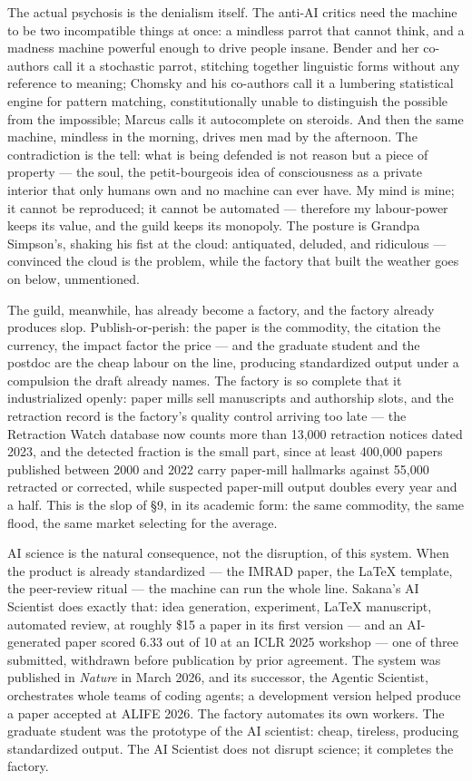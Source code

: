 \documentclass[11pt]{article}
\begin{document}
The actual psychosis is the denialism itself. The anti-AI critics need
the machine to be two incompatible things at once: a mindless parrot
that cannot think, and a madness machine powerful enough to drive
people insane. Bender and her co-authors call it a stochastic parrot,
stitching together linguistic forms without any reference to meaning;
Chomsky and his co-authors call it a lumbering statistical engine for
pattern matching, constitutionally unable to distinguish the possible
from the impossible; Marcus calls it autocomplete on steroids. And then
the same machine, mindless in the morning, drives men mad by the
afternoon. The contradiction is the tell: what is being defended is not
reason but a piece of property --- the soul, the petit-bourgeois idea
of consciousness as a private interior that only humans own and no
machine can ever have. My mind is mine; it cannot be reproduced; it
cannot be automated --- therefore my labour-power keeps its value, and
the guild keeps its monopoly. The posture is Grandpa Simpson's, shaking
his fist at the cloud: antiquated, deluded, and ridiculous --- convinced
the cloud is the problem, while the factory that built the weather goes
on below, unmentioned.

The guild, meanwhile, has already become a factory, and the factory
already produces slop. Publish-or-perish: the paper is the commodity,
the citation the currency, the impact factor the price --- and the
graduate student and the postdoc are the cheap labour on the line,
producing standardized output under a compulsion the draft already
names. The factory is so complete that it industrialized openly: paper
mills sell manuscripts and authorship slots, and the retraction record
is the factory's quality control arriving too late --- the Retraction
Watch database now counts more than 13,000 retraction notices dated
2023, and the detected fraction is the small part, since at least
400,000 papers published between 2000 and 2022 carry paper-mill
hallmarks against 55,000 retracted or corrected, while suspected
paper-mill output doubles every year and a half. This is the slop of \S 9, in its
academic form: the same commodity, the same flood, the same market
selecting for the average.

AI science is the natural consequence, not the disruption, of this
system. When the product is already standardized --- the IMRAD paper,
the LaTeX template, the peer-review ritual --- the machine can run the
whole line. Sakana's AI Scientist does exactly that: idea generation,
experiment, LaTeX manuscript, automated review, at roughly \$15 a
paper in its first version --- and an AI-generated paper scored 6.33
out of 10 at an ICLR 2025 workshop --- one of three submitted,
withdrawn before publication by prior agreement. The system was published in \textit{Nature}
in March 2026, and its successor, the Agentic Scientist, orchestrates
whole teams of coding agents; a development version helped produce a
paper accepted at ALIFE 2026. The factory automates its own workers.
The graduate student was the prototype of the AI scientist: cheap,
tireless, producing standardized output. The AI Scientist does not
disrupt science; it completes the factory.
\end{document}
